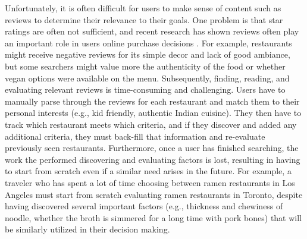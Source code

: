 \documentclass{sigchi}
\begin{document}

Unfortunately, it is often difficult for users to make sense of content such as reviews to determine their relevance to their goals. One problem is that star ratings are often not sufficient, and recent research has shown reviews often play an important role in users online purchase decisions \cite{mudambi2010research,gan2012helpfulness}. For example, restaurants might receive negative reviews for its simple decor and lack of good ambiance, but some searchers might value more the authenticity of the food or whether vegan options were available on the menu. Subsequently, finding, reading, and evaluating relevant reviews is time-consuming and challenging. Users have to manually parse through the reviews for each restaurant and match them to their personal interests (e.g., kid friendly, authentic Indian cuisine). They then have to track which restaurant meets which criteria, and if they discover and added any additional criteria, they must back-fill that information and re-evaluate previously seen restaurants. Furthermore, once a user has finished searching, the work the performed discovering and evaluating factors is lost, resulting in having to start from scratch even if a similar need arises in the future. For example, a traveler who has spent a lot of time choosing between ramen restaurants in Los Angeles must start from scratch evaluating ramen restaurants in Toronto, despite having discovered several important factors (e.g., thickness and chewiness of noodle, whether the broth is simmered for a long time with pork bones) that will be similarly utilized in their decision making.
\end{document}
